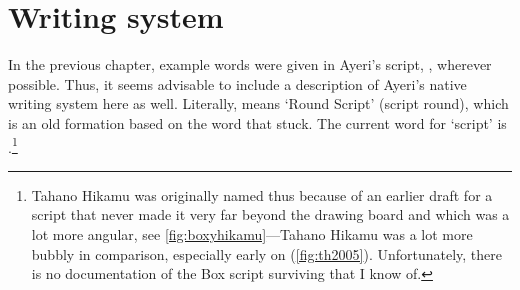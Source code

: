 \chapter{Writing system}
\label{ch:writing}

In the previous chapter, example words were given in Ayeri's script, , wherever possible. Thus, it seems advisable to include a
description of Ayeri's native writing system here as well. Literally,
 means `Round Script' (script round), which is
an old formation based on the word  that stuck. The
current word for `script' is .\footnote{Tahano
Hikamu was originally named thus because of an earlier draft for a
script that never made it very far beyond the drawing board
and which was a lot more angular, see \autoref{fig:boxyhikamu}---Tahano
Hikamu was a lot more bubbly in comparison, especially early on
(\autoref{fig:th2005}). Unfortunately, there is no documentation of the Box
script surviving that I know of.}

